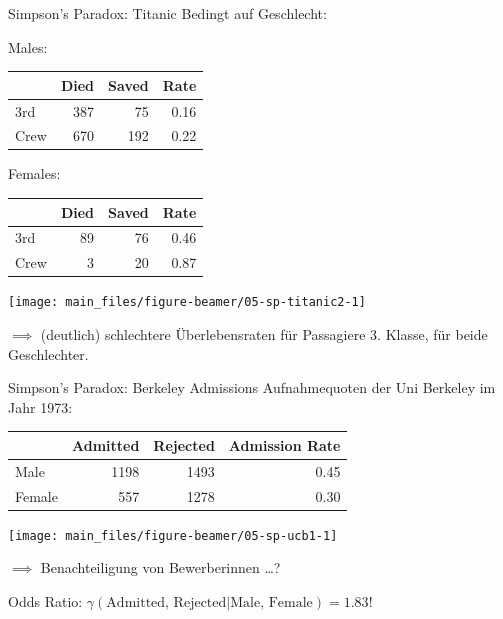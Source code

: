 \documentclass[
  10pt,
  ignorenonframetext,
]{beamer}
\begin{document}
\begin{frame}{Simpson's Paradox: Titanic}
\label{simpsons-paradox-titanic-1}
Bedingt auf Geschlecht:

\scriptsize

\begin{table}
\centering
Males:
\begin{tabular}[t]{l|r|r||r}
  & Died & Saved & Rate\\
\hline
3rd & 387 & 75 & 0.16\\
\hline
Crew & 670 & 192 & 0.22\\
\end{tabular}
Females:
\begin{tabular}[t]{l|r|r||r}
  & Died & Saved & Rate\\
\hline
3rd & 89 & 76 & 0.46\\
\hline
Crew & 3 & 20 & 0.87\\
\end{tabular}
\end{table}

\scriptsize

\begin{center}\texttt{[image: main\_files/figure-beamer/05-sp-titanic2-1]} \end{center}

\normalsize

\(\implies\) (deutlich) schlechtere Überlebensraten für Passagiere 3.
Klasse, für beide Geschlechter.
\end{frame}

\begin{frame}{Simpson's Paradox: Berkeley Admissions}
\label{simpsons-paradox-berkeley-admissions}
Aufnahmequoten der Uni Berkeley im Jahr 1973:

\scriptsize

\begin{tabular}{l|r|r||r}
  & Admitted & Rejected & Admission Rate\\
\hline
Male & 1198 & 1493 & 0.45\\
\hline
Female & 557 & 1278 & 0.30\\
\end{tabular}

\scriptsize

\begin{center}\texttt{[image: main\_files/figure-beamer/05-sp-ucb1-1]} \end{center}

\normalsize

\normalsize

\(\implies\) Benachteiligung von Bewerberinnen \ldots?

Odds Ratio:
\(\gamma(\text{Admitted, Rejected} | \text{Male, Female}) =  1.83\)!
\end{frame}
\end{document}

